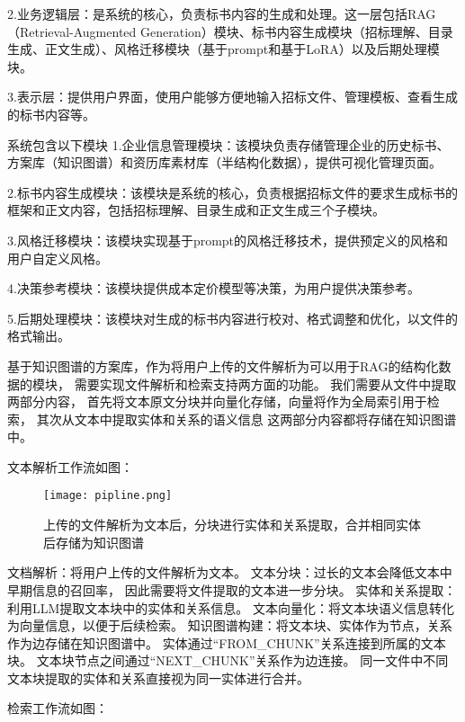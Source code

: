 \documentclass{xmu}
\begin{document}
2.业务逻辑层：是系统的核心，负责标书内容的生成和处理。这一层包括RAG（Retrieval-Augmented Generation）模块、标书内容生成模块（招标理解、目录生成、正文生成）、风格迁移模块（基于prompt和基于LoRA）以及后期处理模块。

3.表示层：提供用户界面，使用户能够方便地输入招标文件、管理模板、查看生成的标书内容等。

系统包含以下模块
1.企业信息管理模块：该模块负责存储管理企业的历史标书、方案库（知识图谱）和资历库素材库（半结构化数据），提供可视化管理页面。

2.标书内容生成模块：该模块是系统的核心，负责根据招标文件的要求生成标书的框架和正文内容，包括招标理解、目录生成和正文生成三个子模块。

3.风格迁移模块：该模块实现基于prompt的风格迁移技术，提供预定义的风格和用户自定义风格。

4.决策参考模块：该模块提供成本定价模型等决策，为用户提供决策参考。

5.后期处理模块：该模块对生成的标书内容进行校对、格式调整和优化，以文件的格式输出。


基于知识图谱的方案库，作为将用户上传的文件解析为可以用于RAG的结构化数据的模块，
需要实现文件解析和检索支持两方面的功能。
我们需要从文件中提取两部分内容，
首先将文本原文分块并向量化存储，向量将作为全局索引用于检索，
其次从文本中提取实体和关系的语义信息
这两部分内容都将存储在知识图谱中。

文本解析工作流如图：

\begin{figure}[!htb]
    \centering
    \texttt{[image: pipline.png]}\\
    \caption{上传的文件解析为文本后，分块进行实体和关系提取，合并相同实体后存储为知识图谱}\label{wenbwenjiexi}
\end{figure}

文档解析：将用户上传的文件解析为文本。
文本分块：过长的文本会降低文本中早期信息的召回率\cite{Long}，
因此需要将文件提取的文本进一步分块。
实体和关系提取：利用LLM提取文本块中的实体和关系信息。
文本向量化：将文本块语义信息转化为向量信息，以便于后续检索。
知识图谱构建：将文本块、实体作为节点，关系作为边存储在知识图谱中。
实体通过“FROM\_CHUNK”关系连接到所属的文本块。
文本块节点之间通过“NEXT\_CHUNK”关系作为边连接。
同一文件中不同文本块提取的实体和关系直接视为同一实体进行合并。

检索工作流如图：
\end{document}

